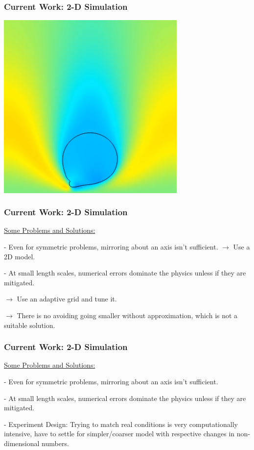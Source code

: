 \documentclass[12pt]{beamer}
\begin{document}
\begin{frame}
    \frametitle{Current Work: 2-D Simulation}

    \includegraphics[width=0.7\textwidth]{img/10-assymetry.png}
\end{frame}
\begin{frame}
    \frametitle{Current Work: 2-D Simulation}
    \underline{Some Problems and Solutions:}

    - Even for symmetric problems, mirroring about an axis isn't sufficient.
    $\rightarrow$ Use a 2D model.

    - At small length scales, numerical errors dominate the physics unless if 
    they are mitigated.

    $\rightarrow$ Use an adaptive grid and tune it.
    
    $\rightarrow$ There is no avoiding going smaller without approximation, 
    which is not a suitable solution.
\end{frame}
\begin{frame}
    \frametitle{Current Work: 2-D Simulation}
    \underline{Some Problems and Solutions:}

    - Even for symmetric problems, mirroring about an axis isn't sufficient.

    - At small length scales, numerical errors dominate the physics unless if 
    they are mitigated.
    
    - Experiment Design: Trying to match real conditions is very 
    computationally intensive, have to settle for simpler/coarser model with 
    respective changes in non-dimensional numbers.
\end{frame}
\end{document}
